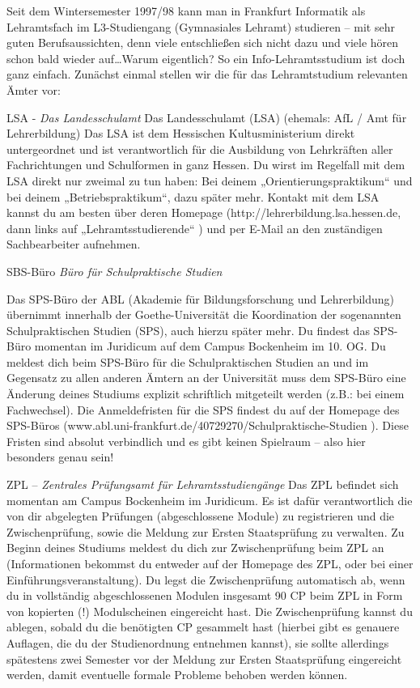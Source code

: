 \spaltenanfang
Seit dem Wintersemester 1997/98 kann man in Frankfurt Informatik als Lehramtsfach im L3-Studiengang (Gymnasiales Lehramt) studieren – mit sehr guten Berufsaussichten, denn viele entschließen sich nicht dazu und viele hören schon bald wieder auf\ldots Warum eigentlich? So ein Info-Lehramtsstudium ist doch ganz einfach. Zunächst einmal stellen wir die für das Lehramtstudium relevanten Ämter vor:


LSA - \textit{Das Landesschulamt}
Das Landesschulamt (LSA) (ehemals: AfL / Amt für Lehrerbildung)
Das LSA ist dem Hessischen Kultusministerium direkt untergeordnet und ist verantwortlich für die Ausbildung von Lehrkräften aller Fachrichtungen und Schulformen in ganz Hessen.
Du wirst im Regelfall mit dem LSA direkt nur zweimal zu tun haben: Bei deinem „Orientierungspraktikum“ und bei deinem „Betriebspraktikum“, dazu später mehr.
Kontakt mit dem LSA kannst du am besten über deren Homepage (http://lehrerbildung.lsa.hessen.de, dann links auf „Lehramtsstudierende“ ) und per E-Mail an den zuständigen Sachbearbeiter aufnehmen.


SBS-Büro \textit{Büro für Schulpraktische Studien}

Das SPS-Büro der ABL (Akademie für Bildungsforschung und Lehrerbildung) übernimmt innerhalb der Goethe-Universität die Koordination der sogenannten Schulpraktischen Studien (SPS), auch hierzu später mehr. Du findest das SPS-Büro momentan im Juridicum auf dem Campus Bockenheim im 10. OG.
Du meldest dich beim SPS-Büro für die Schulpraktischen Studien an und im Gegensatz zu allen anderen Ämtern an der Universität muss dem SPS-Büro eine Änderung deines Studiums explizit schriftlich mitgeteilt werden (z.B.: bei einem Fachwechsel). Die Anmeldefristen für die SPS findest du auf der Homepage des SPS-Büros (www.abl.uni-frankfurt.de/40729270/Schulpraktische-Studien ). Diese Fristen sind absolut verbindlich und es gibt keinen Spielraum – also hier besonders genau sein!


ZPL – \textit{Zentrales Prüfungsamt für Lehramtsstudiengänge}
Das ZPL befindet sich momentan am Campus Bockenheim im Juridicum. Es ist dafür verantwortlich die von dir abgelegten Prüfungen (abgeschlossene Module) zu registrieren und die Zwischenprüfung, sowie die Meldung zur Ersten Staatsprüfung zu verwalten.
Zu Beginn deines Studiums meldest du dich zur Zwischenprüfung beim ZPL an (Informationen bekommst du entweder auf der Homepage des ZPL, oder bei einer Einführungsveranstaltung). Du legst die Zwischenprüfung automatisch ab, wenn du in vollständig abgeschlossenen Modulen insgesamt 90 CP beim ZPL in Form von kopierten (!) Modulscheinen eingereicht hast.
Die Zwischenprüfung kannst du ablegen, sobald du die benötigten CP gesammelt hast (hierbei gibt es genauere Auflagen, die du der Studienordnung entnehmen kannst), sie sollte allerdings spätestens zwei Semester vor der Meldung zur Ersten Staatsprüfung eingereicht werden, damit eventuelle formale Probleme behoben werden können.\\

